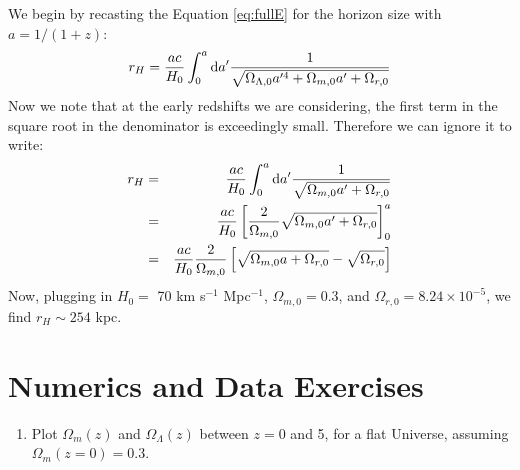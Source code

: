 \begin{enumerate}
\begin{answer}
We begin by recasting the Equation \ref{eq:fullE} for the horizon
size with $a = 1/(1+z)$:
\begin{equation}
r_H = \frac{ac}{H_0} \int_0^a {\rm d}a'
 \frac{1}{\sqrt{\Omega_{\Lambda,0} a'^4 + \Omega_{m,0} a'
+ \Omega_{r,0}}}
\end{equation}
Now we note that at the early redshifts we are considering, the first
term in the square root in the denominator is exceedingly
small. Therefore we can ignore it to write:
\begin{eqnarray}
r_H &=& \frac{ac}{H_0} \int_0^a {\rm d}a'
 \frac{1}{\sqrt{\Omega_{m,0} a' + \Omega_{r,0}}} \cr
&=& \frac{ac}{H_0} \left[\frac{2}{\Omega_{m,0}} \sqrt{\Omega_{m,0} a'
 + \Omega_{r,0}}\right]^a_0\cr
 &=& \frac{ac}{H_0} \frac{2}{\Omega_{m, 0}} \left[\sqrt{\Omega_{m,0} a
 + \Omega_{r,0}} - \sqrt{\Omega_{r,0}}\right]
\end{eqnarray}
Now, plugging in $H_0=$ 70 km s$^{-1}$ Mpc$^{-1}$, $\Omega_{m,0}=0.3$,
and $\Omega_{r,0} = 8.24\times 10^{-5}$, we find $r_H \sim 254$ kpc.
\end{answer}
\end{enumerate}

\section{Numerics and Data Exercises}

\begin{enumerate}
\item Plot $\Omega_m(z)$ and $\Omega_\Lambda(z)$ between $z=0$ and 5,
for a flat Universe, assuming $\Omega_{m}(z=0)=0.3$.
\end{enumerate}


  
